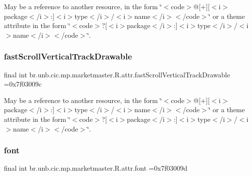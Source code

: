 May be a reference to another resource, in the form \char`\"{}$<$code$>$@\mbox{[}+\mbox{]}\mbox{[}$<$i$>$package$<$/i$>$\+:\mbox{]}$<$i$>$type$<$/i$>$/$<$i$>$name$<$/i$>$$<$/code$>$\char`\"{} or a theme attribute in the form \char`\"{}$<$code$>$?\mbox{[}$<$i$>$package$<$/i$>$\+:\mbox{]}$<$i$>$type$<$/i$>$/$<$i$>$name$<$/i$>$$<$/code$>$\char`\"{}. \mbox{\label{classbr_1_1unb_1_1cic_1_1mp_1_1marketmaster_1_1R_1_1attr_ab6a9905a7927323e794922188547744f}} 
\subsubsection{\texorpdfstring{fast\+Scroll\+Vertical\+Track\+Drawable}{fastScrollVerticalTrackDrawable}}
{\footnotesize\ttfamily final int br.\+unb.\+cic.\+mp.\+marketmaster.\+R.\+attr.\+fast\+Scroll\+Vertical\+Track\+Drawable =0x7f03009c\hspace{0.3cm}{\ttfamily [static]}}

May be a reference to another resource, in the form \char`\"{}$<$code$>$@\mbox{[}+\mbox{]}\mbox{[}$<$i$>$package$<$/i$>$\+:\mbox{]}$<$i$>$type$<$/i$>$/$<$i$>$name$<$/i$>$$<$/code$>$\char`\"{} or a theme attribute in the form \char`\"{}$<$code$>$?\mbox{[}$<$i$>$package$<$/i$>$\+:\mbox{]}$<$i$>$type$<$/i$>$/$<$i$>$name$<$/i$>$$<$/code$>$\char`\"{}. \mbox{\label{classbr_1_1unb_1_1cic_1_1mp_1_1marketmaster_1_1R_1_1attr_a9c0c4e2a4861386cb82a7249724d874f}} 
\subsubsection{\texorpdfstring{font}{font}}
{\footnotesize\ttfamily final int br.\+unb.\+cic.\+mp.\+marketmaster.\+R.\+attr.\+font =0x7f03009d\hspace{0.3cm}{\ttfamily [static]}}

